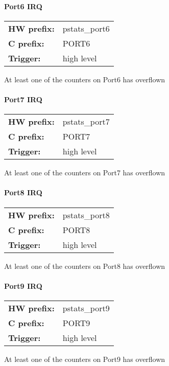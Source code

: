 \paragraph*{Port6 IRQ}\vspace{12pt}
\begin{small}
\begin{tabular}{l l }
{\bf HW prefix:}  & pstats\_port6\\
{\bf C prefix:}  & PORT6\\
{\bf Trigger:}  & high level\\
\end{tabular}

\end{small}
\vspace{12pt}
At least one of the counters on Port6 has overflown
\paragraph*{Port7 IRQ}\vspace{12pt}
\begin{small}
\begin{tabular}{l l }
{\bf HW prefix:}  & pstats\_port7\\
{\bf C prefix:}  & PORT7\\
{\bf Trigger:}  & high level\\
\end{tabular}

\end{small}
\vspace{12pt}
At least one of the counters on Port7 has overflown
\paragraph*{Port8 IRQ}\vspace{12pt}
\begin{small}
\begin{tabular}{l l }
{\bf HW prefix:}  & pstats\_port8\\
{\bf C prefix:}  & PORT8\\
{\bf Trigger:}  & high level\\
\end{tabular}

\end{small}
\vspace{12pt}
At least one of the counters on Port8 has overflown
\paragraph*{Port9 IRQ}\vspace{12pt}
\begin{small}
\begin{tabular}{l l }
{\bf HW prefix:}  & pstats\_port9\\
{\bf C prefix:}  & PORT9\\
{\bf Trigger:}  & high level\\
\end{tabular}

\end{small}
\vspace{12pt}
At least one of the counters on Port9 has overflown
